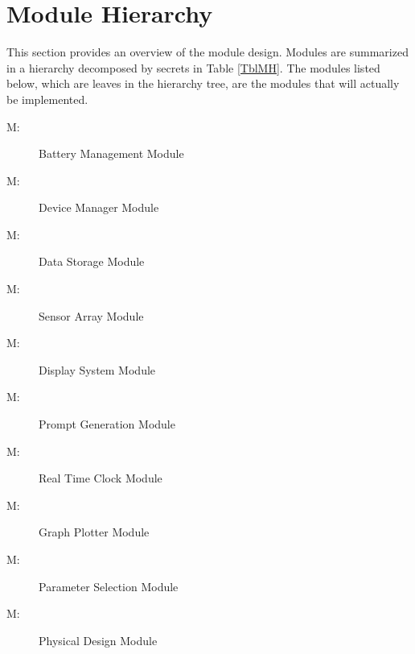 \documentclass[12pt, titlepage]{article}
\newcounter{mnum}
\newcommand{\mthemnum}{M\themnum}
\begin{document}
\section{Module Hierarchy} \label{SecMH}

This section provides an overview of the module design. Modules are summarized
in a hierarchy decomposed by secrets in Table \ref{TblMH}. The modules listed
below, which are leaves in the hierarchy tree, are the modules that will
actually be implemented.

\begin{description}
  \item [ \mthemnum \label{mBM}:] Battery Management Module
  \item [ \mthemnum \label{mDM}:] Device Manager Module
  \item [ \mthemnum \label{mDS_1}:] Data Storage Module
  \item [ \mthemnum \label{mSA}:] Sensor Array Module
  \item [ \mthemnum \label{mDS_2}:] Display System Module
  \item [ \mthemnum \label{mPG}:] Prompt Generation Module
  \item [ \mthemnum \label{mRTC}:] Real Time Clock  Module
  \item [ \mthemnum \label{mGP}:] Graph Plotter  Module
  \item [ \mthemnum \label{mPS}:] Parameter Selection Module
  \item [ \mthemnum \label{mPD}:] Physical Design Module
\end{description}
\end{document}
